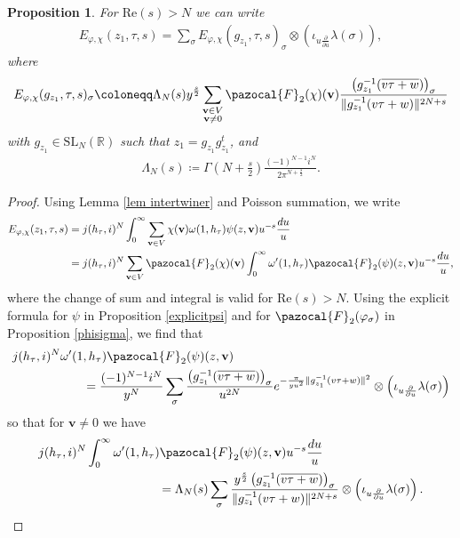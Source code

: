 \documentclass[a4paper,11pt]{amsart} %
\newcommand{\8}{\infty}
\newcommand{\vbf}{\mathbf{v}}
\newcommand{\four}{\pazocal{F}}
\newcommand{\SL}{\mathrm{SL}}
\newcommand{\R}{\mathbb{R}}
\newcommand{\re}{\mathrm{Re}}
\theoremstyle{mytheoremstyle}
\newtheorem{prop}[thm]{Proposition}
\theoremstyle{remark}
\numberwithin{equation}{section}
\begin{document}
\begin{prop} \label{eisensteinseries}For $\re(s)>N$ we can write
\begin{align}
 E_{\varphi, \chi}(z_1,\tau,s) = \sum_{\sigma}  E_{\varphi, \chi}(g_{z_1},\tau,s)_\sigma \otimes \left ( \iota_{u \frac{\partial}{\partial u}} \lambda(\sigma) \right ),
\end{align}
where
\begin{align}
E_{\varphi, \chi}(g_{z_1},\tau,s)_\sigma \coloneqq \Lambda_N(s) y^{\frac{s}{2}} \sum_{\substack{\vbf \in V \\ \vbf \neq 0}} \four_2(\chi)(\vbf)  \frac{\left (g_{z_1}^{-1}(\overline{v\tau+w}) \right )_\sigma}{\lVert g_{z_1}^{-1}(v\tau+w) \rVert^{2N+s}}
\end{align}
with $g_{z_1} \in \SL_N(\R)$ such that $z_1=g_{z_1}g_{z_1}^t$, and 
\begin{align}
\Lambda_N(s) \coloneqq \Gamma \left ( N+\frac{s}{2}\right ) \frac{(-1)^{N-1}i^{N}}{2\pi^{N+\frac{s}{2}}}.
\end{align}
\end{prop}
\begin{proof}
Using Lemma \ref{lem intertwiner} and Poisson summation, we write
\begin{align}
E_{\varphi, \chi}(z_1,\tau,s)& = j(h_\tau,i)^{N} \int_{0}^\8 \sum_{\vbf \in V} \chi(\vbf)  \omega(1,h_\tau)\psi(z,\vbf)u^{-s} \frac{du}{u}\nonumber \\
& = j(h_\tau,i)^{N} \sum_{\vbf \in V} \four_2(\chi)(\vbf) \int_{0}^\8 \omega'(1,h_\tau)\four_2(\psi)(z,\vbf)u^{-s} \frac{du}{u},
\end{align}
where the change of sum and integral is valid for $\re(s)>N$. Using the explicit formula for $\psi$ in Proposition \ref{explicitpsi} and for $\four_2(\varphi_\sigma)$ in Proposition \ref{phisigma}, we find that
\begin{align*}
   & j(h_\tau,i)^{N}\omega'(1,h_\tau)\four_2(\psi)(z,\vbf) \nonumber \\
    & \hspace{2cm} = \frac{(-1)^{N-1}i^N}{y^N} \sum_{\sigma}  \frac{\left (g_{z_1}^{-1}(\overline{v\tau+w}) \right )_\sigma}{u^{2N}} e^{-\frac{\pi}{yu^{2}}\lVert g_{z_1}^{-1}(v\tau+w) \rVert^2}\otimes \left (  \iota_{u \frac{\partial}{\partial u}} \lambda(\sigma)  \right )
\end{align*}
so that for $\vbf \neq 0$ we have
\begin{align} \label{sigmhatform}
    & j(h_\tau,i)^{N}\int_{0}^\8 \omega'(1,h_\tau)\four_2(\psi)(z,\vbf) u^{-s} \frac{du}{u}  \nonumber \\
    & \hspace{2cm} \qquad \qquad=\Lambda_N(s)  \sum_{\sigma}  \frac{y^{\frac{s}{2}}  \left(g_{z_1}^{-1}(\overline{v\tau+w}) \right )_\sigma}{\lVert g_{z_1}^{-1}(v\tau+w) \rVert^{2N+s}} \otimes \left ( \iota_{u \frac{\partial}{\partial u}} \lambda(\sigma)  \right ).
\end{align}
\end{proof}
\end{document}
